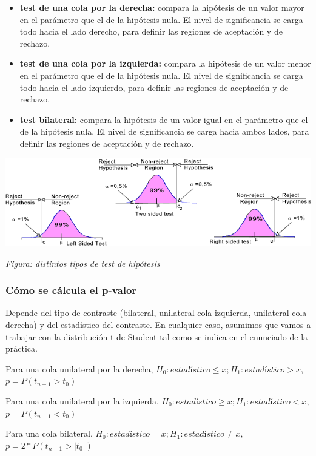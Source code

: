 \documentclass[11pt]{article}
\makeatletter
\def\maxwidth{\ifdim\Gin@nat@width>\linewidth\linewidth
    \else\Gin@nat@width\fi}
\let\Oldincludegraphics\includegraphics
\renewcommand{\includegraphics}[1]{\Oldincludegraphics[width=.8\maxwidth]{#1}}
\providecommand{\tightlist}{%
      \setlength{\itemsep}{0pt}\setlength{\parskip}{0pt}}
\def\gt{>}
\def\lt{<}
\makeatother
\begin{document}
\begin{itemize}
\tightlist
\item
  \textbf{test de una cola por la derecha:} compara la hipótesis de un
  valor mayor en el parámetro que el de la hipótesis nula. El nivel de
  significancia se carga todo hacia el lado derecho, para definir las
  regiones de aceptación y de rechazo.
\item
  \textbf{test de una cola por la izquierda:} compara la hipótesis de un
  valor menor en el parámetro que el de la hipótesis nula. El nivel de
  significancia se carga todo hacia el lado izquierdo, para definir las
  regiones de aceptación y de rechazo.
\item
  \textbf{test bilateral:} compara la hipótesis de un valor igual en el
  parámetro que el de la hipótesis nula. El nivel de significancia se
  carga hacia ambos lados, para definir las regiones de aceptación y de
  rechazo.
\end{itemize}

\[ \] \includegraphics{stat_83.png} \[ \]

\emph{Figura: distintos tipos de test de hipótesis}

\subsubsection{Cómo se cálcula el
p-valor}\label{cuxf3mo-se-cuxe1lcula-el-p-valor}

Depende del tipo de contraste (bilateral, unilateral cola izquierda,
unilateral cola derecha) y del estadístico del contraste. En cualquier
caso, asumimos que vamos a trabajar con la distribución t de Student tal
como se indica en el enunciado de la práctica.

Para una cola unilateral por la derecha,
\(H_0: estadístico \le x; H_1: estadístico \gt x\),
\(p = P(t_{n-1} \gt t_0)\)

Para una cola unilateral por la izquierda,
\(H_0: estadístico \ge x; H_1: estadístico \lt x\),
\(p = P(t_{n-1} \lt t_0)\)

Para una cola bilateral,
\(H_0: estadístico = x; H_1: estadístico \ne x\),
\(p = 2 * P(t_{n-1} \gt \vert t_0 \vert)\)
\end{document}
